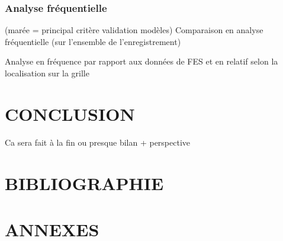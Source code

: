 \documentclass[10pt,a4paper,titlepage]{article}
\begin{document}
    \subsubsection{Analyse fréquentielle}
    (marée = principal critère validation modèles)
    Comparaison en analyse fréquentielle (sur l'ensemble de l'enregistrement)
    
    Analyse en fréquence par rapport aux données de FES et en relatif selon la localisation sur la grille
    
    \newpage
    
    \section{CONCLUSION}
    \label{sec:conclusion}
    
    Ca sera fait à la fin ou presque
    bilan + perspective
    
    \newpage
    \section{BIBLIOGRAPHIE}
    \printbibliography
    
    \newpage
    \section{ANNEXES}
    \label{annexes}
\end{document}
